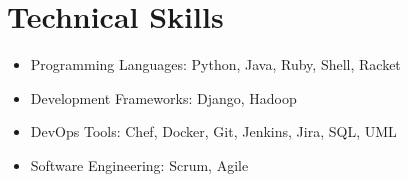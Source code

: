 \documentclass{resume}
\begin{document}
%
%

\section{Technical Skills}
\begin{itemize}[parsep=0.5ex]
  \item Programming Languages: Python, Java, Ruby, Shell, Racket
  \item Development Frameworks: Django, Hadoop
  \item DevOps Tools: Chef, Docker, Git, Jenkins, Jira, SQL, UML
  \item Software Engineering: Scrum, Agile
\end{itemize}

%
%

%
%




\end{document}
